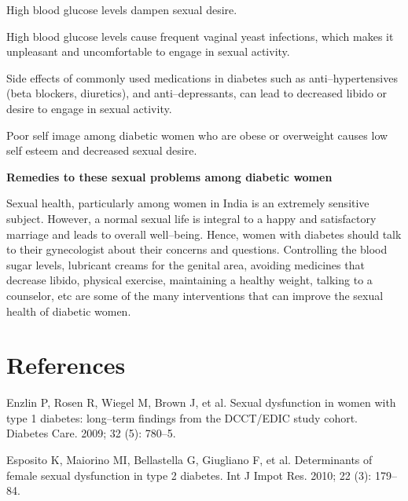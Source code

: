  \item High blood glucose levels dampen sexual desire.

 \item High blood glucose levels cause frequent vaginal yeast infections, which makes it unpleasant and uncomfortable to engage in sexual activity.

 \item Side effects of commonly used medications in diabetes such as anti–hypertensives (beta blockers, diuretics), and anti–depressants, can lead to decreased libido or desire to engage in sexual activity.

 \item Poor self image among diabetic women who are obese or overweight causes low self esteem and decreased sexual desire.

\textbf{Remedies to these sexual problems among diabetic women}

Sexual health, particularly among women in India is an extremely sensitive subject. However, a normal sexual life is integral to a happy and satisfactory marriage and leads to overall well–being. Hence, women with diabetes should talk to their gynecologist about their concerns and questions. Controlling the blood sugar levels, lubricant creams for the genital area, avoiding medicines that decrease libido, physical exercise, maintaining a healthy weight, talking to a counselor, etc are some of the many interventions that can improve the sexual health of diabetic women.

\section*{References}

\begin{thebibliography}{99}
 Enzlin P, Rosen R, Wiegel M, Brown J, et al. Sexual dysfunction in women with type 1 diabetes: long–term findings from the DCCT/EDIC study cohort. Diabetes Care. 2009; 32 (5): 780–5.

  Esposito K, Maiorino MI, Bellastella G, Giugliano F, et al. Determinants of female sexual dysfunction in type 2 diabetes. Int J Impot Res. 2010; 22 (3): 179–84.

 \end{thebibliography}

